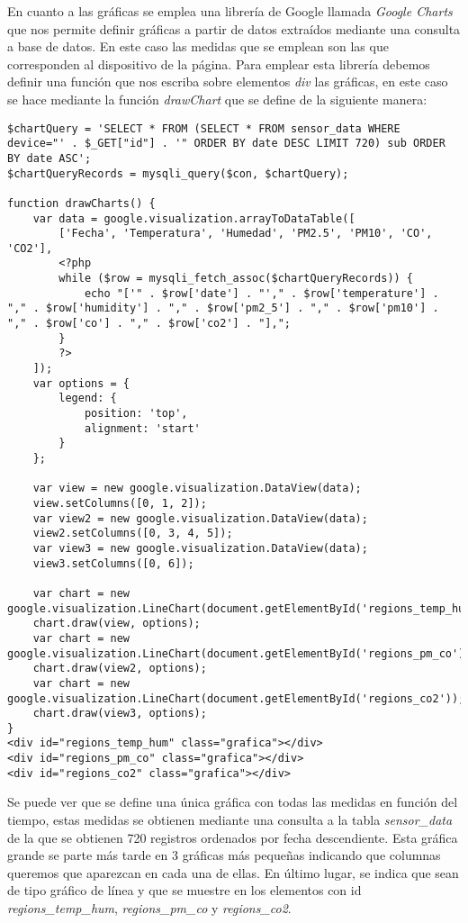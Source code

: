En cuanto a las gráficas se emplea una librería de Google llamada \textit{Google Charts} que nos permite definir gráficas a partir de datos extraídos mediante una consulta a base de datos. En este caso las medidas que se emplean son las que corresponden al dispositivo de la página. Para emplear esta librería debemos definir una función que nos escriba sobre elementos \textit{div} las gráficas, en este caso se hace mediante la función \textit{drawChart} que se define de la siguiente manera:
\begin{lstlisting}
$chartQuery = 'SELECT * FROM (SELECT * FROM sensor_data WHERE device="' . $_GET["id"] . '" ORDER BY date DESC LIMIT 720) sub ORDER BY date ASC';
$chartQueryRecords = mysqli_query($con, $chartQuery);

function drawCharts() {
    var data = google.visualization.arrayToDataTable([
        ['Fecha', 'Temperatura', 'Humedad', 'PM2.5', 'PM10', 'CO', 'CO2'],
        <?php
        while ($row = mysqli_fetch_assoc($chartQueryRecords)) {
            echo "['" . $row['date'] . "'," . $row['temperature'] . "," . $row['humidity'] . "," . $row['pm2_5'] . "," . $row['pm10'] . "," . $row['co'] . "," . $row['co2'] . "],";
        }
        ?>
    ]);
    var options = {
        legend: {
            position: 'top',
            alignment: 'start'
        }
    };

    var view = new google.visualization.DataView(data);
    view.setColumns([0, 1, 2]);
    var view2 = new google.visualization.DataView(data);
    view2.setColumns([0, 3, 4, 5]);
    var view3 = new google.visualization.DataView(data);
    view3.setColumns([0, 6]);

    var chart = new google.visualization.LineChart(document.getElementById('regions_temp_hum'));
    chart.draw(view, options);
    var chart = new google.visualization.LineChart(document.getElementById('regions_pm_co'));
    chart.draw(view2, options);
    var chart = new google.visualization.LineChart(document.getElementById('regions_co2'));
    chart.draw(view3, options);
}
<div id="regions_temp_hum" class="grafica"></div>
<div id="regions_pm_co" class="grafica"></div>
<div id="regions_co2" class="grafica"></div>
\end{lstlisting}

Se puede ver que se define una única gráfica con todas las medidas en función del tiempo, estas medidas se obtienen mediante una consulta a la tabla \textit{sensor\_data} de la que se obtienen 720 registros ordenados por fecha descendiente. Esta gráfica grande se parte más tarde en 3 gráficas más pequeñas indicando que columnas queremos que aparezcan en cada una de ellas. En último lugar, se indica que sean de tipo gráfico de línea y que se muestre en los elementos con id \textit{regions\_temp\_hum}, \textit{regions\_pm\_co} y \textit{regions\_co2}.

